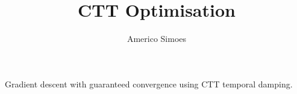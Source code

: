 \documentclass[12pt]{article}
\begin{document}
\title{CTT Optimisation}
\author{Americo Simoes}
\maketitle
Gradient descent with guaranteed convergence using CTT temporal damping.
\end{document}
